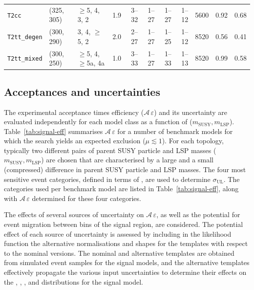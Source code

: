 \begin{table}[!t]
{\begin{tabular}{ lllcrrrrrcc }
      \multirow{1}{*}{\texttt{T2cc}}
 & (325, 305)  & $\geq$5, 4, 3, 2         & \phantom{1}1.9 & 3--32  & 1--27   & 1--27 & 1--12 & 5600 & 0.92 & 0.68 \\ [0.5ex]
      \multirow{1}{*}{\texttt{T2tt\_degen}}
 & (300, 290)  & 3, 4, $\geq$5, 2         & \phantom{1}2.0 & 2--27  & 1--27   & 1--25 & 1--12 & 8520 & 0.56 & 0.41 \\ [0.5ex]
      \multirow{1}{*}{\texttt{T2tt\_mixed}}
 & (300, 250)  & $\geq$5, 4, $\geq$5a, 4a & \phantom{1}1.0 & 3--33  & 1--27   & 1--33 & 1--13 & 8520 & 0.99 & 0.58 \\ [0.5ex]
      \hline
    \end{tabular}
  }
\end{table}

\subsection{Acceptances and uncertainties}

The experimental acceptance times efficiency
($\mathcal{A}\,\varepsilon$) and its uncertainty are evaluated
independently for each model class as a function of ($m_\text{SUSY},
m_\text{LSP}$). Table~\ref{tab:signal-eff} summarises
$\mathcal{A}\,\varepsilon$ for a number of benchmark models for
which the search yields an expected exclusion ($\mu \lesssim 1$). For
each topology, typically two different pairs of parent SUSY particle and
LSP masses ($m_\text{SUSY}, m_\text{LSP}$) are chosen that are
characterised by a large and a small (\ie compressed) difference
in parent SUSY particle and LSP masses. The four most sensitive event
categories, defined in terms of \njet, are used to determine
$\sigma_\text{UL}$. The categories used per benchmark model are listed
in Table~\ref{tab:signal-eff}, along with
$\mathcal{A}\,\varepsilon$ determined for these four categories.

The effects of several sources of uncertainty on
$\mathcal{A}\,\varepsilon$, as well as the potential for event
migration between bins of the signal region, are considered. The
potential effect of each source of uncertainty is assessed by
including in the likelihood function the alternative normalisations
and shapes for the \HTmiss templates with respect to the nominal
versions. The nominal and alternative templates are obtained from
simulated event samples for the signal models, and the alternative
templates effectively propagate the various input uncertainties to
determine their effects on the \njet, \nb, \scalht, and \HTmiss
distributions for the signal model.

